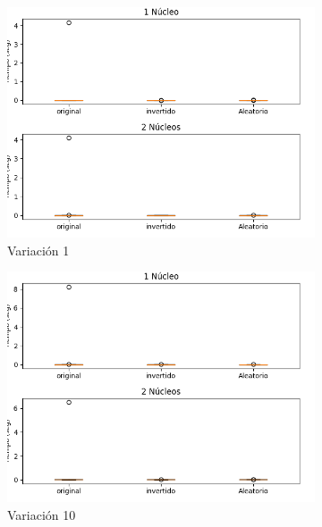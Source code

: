 \documentclass{article}
\begin{document}
\begin{figure}[h!]
       \centering
       \begin{subfigure}[b]{0.45\linewidth}
           \includegraphics[width=\linewidth]{Figure_1.png}
           \caption{Variaci\'on 1}
           \label{fig:westminster_lateral}
        \end{subfigure}
        \begin{subfigure}[b]{0.45\linewidth}
            \includegraphics[width=\linewidth]{Figure_1(10).png}
            \caption{Variaci\'on 10}
            \label{fig:westminster_aerea}
        \end{subfigure}
        \begin{subfigure}[b]{0.45\linewidth}

\end{subfigure}
\end{figure}
\end{document}
